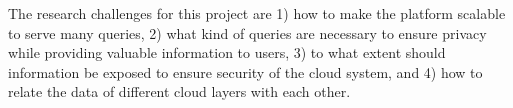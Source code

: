 The research challenges for this project are 1) how to make the platform scalable to serve many queries, 2) what kind of queries are necessary to ensure privacy while providing valuable information to users, 3) to what extent should information be exposed to ensure security of the cloud system, and 4) how to relate the data of different cloud layers with each other. 







